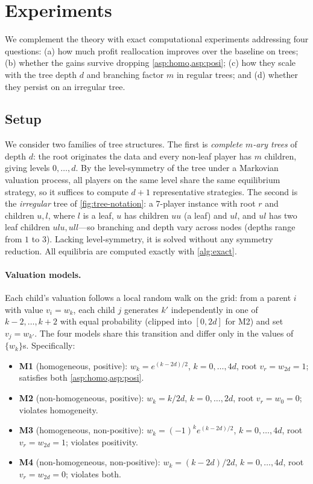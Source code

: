\section{Experiments}
\label{sec:exp}

We complement the theory with exact computational experiments addressing four questions: (a) how much profit reallocation improves over the baseline on trees; (b) whether the gains survive dropping \cref{asp:homo,asp:posi}; (c) how they scale with the tree depth $d$ and branching factor $m$ in regular trees; and (d) whether they persist on an irregular tree.

\subsection{Setup}

We consider two families of tree structures. The first is \emph{complete $m$-ary trees} of depth $d$: the root originates the data and every non-leaf player has $m$ children, giving levels $0,\ldots,d$. By the level-symmetry of the tree under a Markovian valuation process, all players on the same level share the same equilibrium strategy, so it suffices to compute $d+1$ representative strategies. The second is the \emph{irregular} tree of \cref{fig:tree-notation}: a $7$-player instance with root $r$ and children $u,l$, where $l$ is a leaf, $u$ has children $uu$ (a leaf) and $ul$, and $ul$ has two leaf children $ulu,ull$---so branching and depth vary across nodes (depths range from $1$ to $3$). Lacking level-symmetry, it is solved without any symmetry reduction. All equilibria are computed exactly with \cref{alg:exact}.

\paragraph{Valuation models.}
Each child's valuation follows a local random walk on the grid: from a parent $i$ with value $v_i = w_k$, each child $j$ generates $k'$ independently in one of $k-2,\dots,k+2$ with equal probability (clipped into $[0,2d]$ for M2) and set $v_j = w_{k'}$. The four models share this transition and differ only in the values of $\{w_k\}$s. Specifically:
\begin{itemize}[left=0em]\itemsep0.1em
\item \textbf{M1} (homogeneous, positive): $w_k = e^{(k-2d)/2}$, $k=0,\ldots,4d$, root $v_r = w_{2d} = 1$; satisfies both \cref{asp:homo,asp:posi}.
\item \textbf{M2} (non-homogeneous, positive): $w_k = k/2d$, $k=0,\ldots,2d$, root $v_r = w_0 = 0$; violates homogeneity.
\item \textbf{M3} (homogeneous, non-positive): $w_k = (-1)^k e^{(k-2d)/2}$, $k=0,\ldots,4d$, root $v_r = w_{2d} = 1$; violates positivity.
\item \textbf{M4} (non-homogeneous, non-positive): $w_k = (k-2d)/2d$, $k=0,\ldots,4d$, root $v_r = w_{2d} = 0$; violates both.
\end{itemize}

